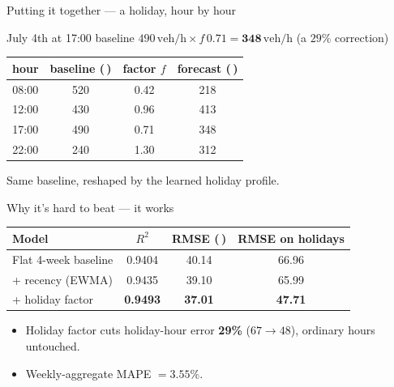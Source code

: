 \documentclass[aspectratio=169,11pt]{beamer}
\newcommand{\veh}{\,\text{veh/h}}
\begin{document}
\begin{frame}{Putting it together --- a holiday, hour by hour}
  \begin{exampleblock}{July 4th at 17:00}
    baseline $490\veh \times f\,0.71 = \mathbf{348}\veh$ \quad (a $29\%$ correction)
  \end{exampleblock}
  \vfill
  \centering
  \begin{tabular}{cccc}
    \toprule
    hour & baseline (\veh) & factor $f$ & forecast (\veh) \\
    \midrule
    08:00 & 520 & 0.42 & 218 \\
    12:00 & 430 & 0.96 & 413 \\
    17:00 & 490 & 0.71 & 348 \\
    22:00 & 240 & 1.30 & 312 \\
    \bottomrule
  \end{tabular}
  \vfill
  \footnotesize Same baseline, reshaped by the learned holiday profile.
\end{frame}

\begin{frame}{Why it's hard to beat --- it works}
  \centering
  \begin{tabular}{lccc}
    \toprule
    Model & $R^2$ & RMSE (\veh) & RMSE on holidays \\
    \midrule
    Flat 4-week baseline       & 0.9404 & 40.14 & 66.96 \\
    \;+ recency (EWMA)         & 0.9435 & 39.10 & 65.99 \\
    \;+ holiday factor         & \textbf{0.9493} & \textbf{37.01} & \textbf{47.71} \\
    \bottomrule
  \end{tabular}
  \vfill
  \begin{itemize}
    \item Holiday factor cuts holiday-hour error \textbf{29\%} ($67\to48$),
      ordinary hours untouched.
    \item Weekly-aggregate MAPE $= \mathbf{3.55\%}$.
  \end{itemize}
\end{frame}
\end{document}
